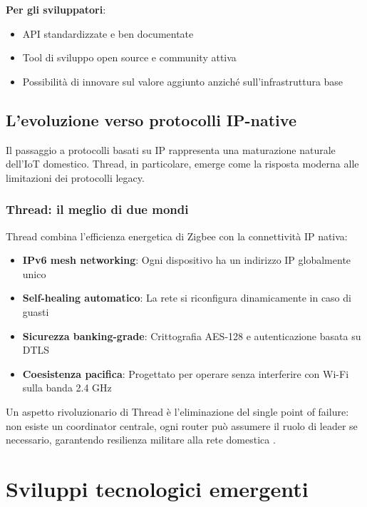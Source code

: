 \textbf{Per gli sviluppatori}:
\begin{itemize}
    \item API standardizzate e ben documentate
    \item Tool di sviluppo open source e community attiva
    \item Possibilità di innovare sul valore aggiunto anziché sull'infrastruttura base
\end{itemize}

\subsection{L'evoluzione verso protocolli IP-native}

Il passaggio a protocolli basati su IP rappresenta una maturazione naturale dell'IoT domestico. Thread, in particolare, emerge come la risposta moderna alle limitazioni dei protocolli legacy.

\subsubsection{Thread: il meglio di due mondi}

Thread combina l'efficienza energetica di Zigbee con la connettività IP nativa:

\begin{itemize}
    \item \textbf{IPv6 mesh networking}: Ogni dispositivo ha un indirizzo IP globalmente unico
    \item \textbf{Self-healing automatico}: La rete si riconfigura dinamicamente in caso di guasti
    \item \textbf{Sicurezza banking-grade}: Crittografia AES-128 e autenticazione basata su DTLS
    \item \textbf{Coesistenza pacifica}: Progettato per operare senza interferire con Wi-Fi sulla banda 2.4 GHz
\end{itemize}

Un aspetto rivoluzionario di Thread è l'eliminazione del single point of failure: non esiste un coordinator centrale, ogni router può assumere il ruolo di leader se necessario, garantendo resilienza militare alla rete domestica \parencite{zillner2022matter}.

\section{Sviluppi tecnologici emergenti}

